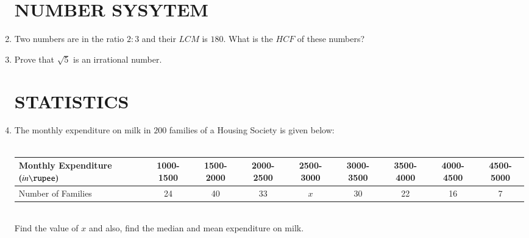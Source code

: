 \documentclass[12pt,-letter paper]{article}
\providecommand{\brak}[1]{\ensuremath{\left(#1\right)}}
\begin{document}
\begin{enumerate}
\section*{NUMBER SYSYTEM}
\item
Two numbers are in the ratio $2:3$ and their $LCM$ is $180$. What is the $HCF$ of these numbers?
\item
Prove that $\sqrt{5}$ is an irrational number.
\section*{STATISTICS}
\item
The monthly expenditure on milk in $200$ families of a Housing Society is given below:\\
\\
\footnotesize
\setlength{\tabcolsep}{1pt}
\begin{tabular}{|l|c|c|c|c|c|c|c|c|}
\hline
	Monthly Expenditure \brak{in \rupee} & 1000-1500 & 1500-2000 & 2000-2500 & 2500-3000 & 3000-3500 & 3500-4000 & 4000-4500 & 4500-5000 \\ \hline
Number of Families & 24 & 40 & 33 & $x$ & 30 & 22 & 16 & 7 \\ \hline
\end{tabular}\\

Find the value of $x$ and also, find the median and mean expenditure on milk.



\end{enumerate}
\end{document}
